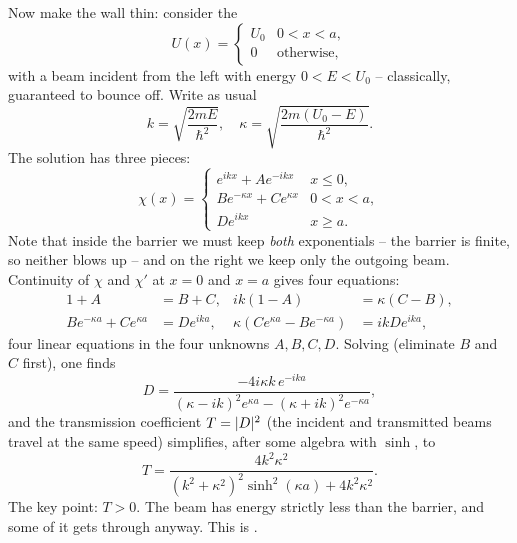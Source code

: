 \documentclass[a4paper]{scrartcl}
\begin{document}
Now make the wall thin: consider the 
$$
U(x) = \begin{cases}
    U_0 & 0 < x < a, \\
    0 & \text{otherwise},
\end{cases}
$$
with a beam incident from the left with energy $0 < E < U_0$ -- classically, guaranteed to bounce off. Write as usual
$$
k = \sqrt{\frac{2mE}{\hbar^2}}, \quad \kappa = \sqrt{\frac{2m(U_0 - E)}{\hbar^2}}.
$$
The solution has three pieces:
$$
\chi(x) = \begin{cases}
    e^{ikx} + A e^{-ikx} & x \leq 0, \\
    B e^{-\kappa x} + C e^{\kappa x} & 0 < x < a, \\
    D e^{ikx} & x \geq a.
\end{cases}
$$
Note that inside the barrier we must keep \emph{both} exponentials -- the barrier is finite, so neither blows up -- and on the right we keep only the outgoing beam. Continuity of $\chi$ and $\chi'$ at $x = 0$ and $x = a$ gives four equations:
\begin{align*}
    1 + A &= B + C, & ik(1 - A) &= \kappa(C - B), \\
    B e^{-\kappa a} + C e^{\kappa a} &= D e^{ika}, & \kappa(C e^{\kappa a} - B e^{-\kappa a}) &= ik D e^{ika},
\end{align*}
four linear equations in the four unknowns $A, B, C, D$. Solving (eliminate $B$ and $C$ first), one finds
$$
D = \frac{-4 i \kappa k \, e^{-ika}}{(\kappa - ik)^2 e^{\kappa a} - (\kappa + ik)^2 e^{-\kappa a}},
$$
and the transmission coefficient $T = \lvert D\rvert^2$ (the incident and transmitted beams travel at the same speed) simplifies, after some algebra with $\sinh$, to
$$
T = \frac{4 k^2 \kappa^2}{(k^2 + \kappa^2)^2 \sinh^2 (\kappa a) + 4 k^2 \kappa^2}.
$$
The key point: \emph{$T > 0$}. The beam has energy strictly less than the barrier, and some of it gets through anyway. This is .
\end{document}
